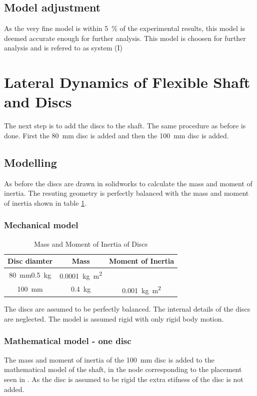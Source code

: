 \subsection{Model adjustment}
As the very fine model is within \SI{5}{\percent} of the experimental results, this model is deemed accurate enough for further analysis. This model is choosen for further analysis and is refered to as system (I)

\section{Lateral Dynamics of Flexible Shaft and Discs}
The next step is to add the discs to the shaft. The same procedure as before is done. First the \SI{80}{\milli \meter} disc is added and then the \SI{100}{\milli \meter} disc is added.

\subsection{Modelling}
As before the discs are drawn in solidworks to calculate the mass and moment of inertia. The resuting geometry is perfectly balanced with the mass and moment of inertia shown in table \ref{tab:disc_mass_moment}.

\subsubsection{Mechanical model}
\begin{table}[htbp]
    \centering
    \caption{Mass and Moment of Inertia of Discs}
    \label{tab:disc_mass_moment}
    \begin{tabular}{@{}ccc@{}}
        \toprule
        Disc diamter    &   Mass                    &   Moment of Inertia                       \\ \midrule
        \SI{80}{\milli \meter}\SI{0.5}{\kilo \gram}   &   \SI{0.0001}{\kilo \gram \square \meter} \\ 
        \SI{100}{\milli \meter} &   \SI{0.4}{\kilo \gram}   &   \SI{0.001}{\kilo \gram \square \meter}\\ \bottomrule
    \end{tabular}
\end{table}

The discs are assumed to be perfectly balanced. The internal details of the discs are neglected.
The model is assumed rigid with only rigid body motion. 

\subsubsection{Mathematical model - one disc}
The mass and moment of inertia of the \SI{100}{\milli \meter} disc is added to the mathematical model of the shaft, in the node corresponding to the placement seen in \cite[Appendix]{Problem}.
As the disc is assumed to be rigid the extra stifness of the disc is not added.

